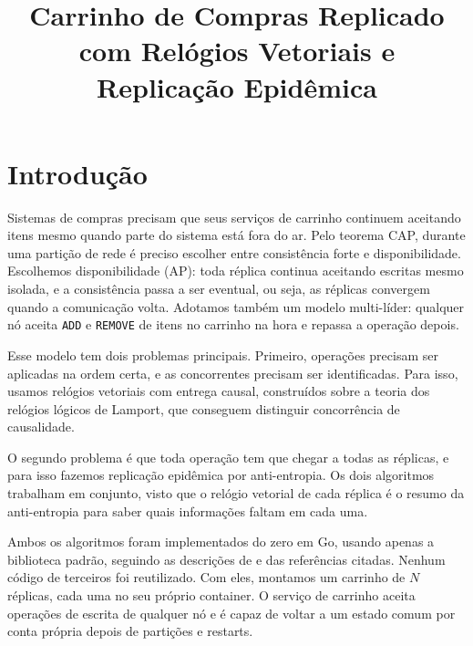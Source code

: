 \documentclass[conference,a4paper]{IEEEtran}
\begin{document}
\title{Carrinho de Compras Replicado com Relógios Vetoriais e Replicação Epidêmica}

\author{
}

\maketitle

\section{Introdução}
Sistemas de compras precisam que seus serviços de carrinho continuem aceitando itens mesmo quando parte do sistema está fora do ar. Pelo teorema CAP, durante uma partição de rede é preciso escolher entre consistência forte e disponibilidade. Escolhemos disponibilidade (AP): toda réplica continua aceitando escritas mesmo isolada, e a consistência passa a ser eventual, ou seja, as réplicas convergem quando a comunicação volta. Adotamos também um modelo multi-líder: qualquer nó aceita \texttt{ADD} e \texttt{REMOVE} de itens no carrinho na hora e repassa a operação depois.

Esse modelo tem dois problemas principais. Primeiro, operações precisam ser aplicadas na ordem certa, e as concorrentes precisam ser identificadas. Para isso, usamos relógios vetoriais com entrega causal, construídos sobre a teoria dos relógios lógicos de Lamport, que conseguem distinguir concorrência de causalidade.

O segundo problema é que toda operação tem que chegar a todas as réplicas, e para isso fazemos replicação epidêmica por anti-entropia. Os dois algoritmos trabalham em conjunto, visto que o relógio vetorial de cada réplica é o resumo da anti-entropia para saber quais informações faltam em cada uma.

Ambos os algoritmos foram implementados do zero em Go, usando apenas a biblioteca padrão, seguindo as descrições de e das referências citadas. Nenhum código de terceiros foi reutilizado. Com eles, montamos um carrinho de $N$ réplicas, cada uma no seu próprio container. O serviço de carrinho aceita operações de escrita de qualquer nó e é capaz de voltar a um estado comum por conta própria depois de partições e restarts.
\end{document}
